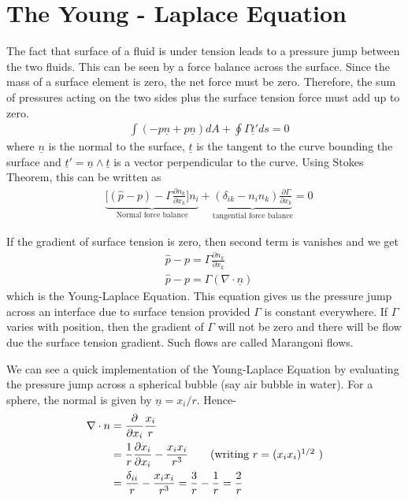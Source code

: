 \documentclass[11pt,a4paper]{article}
\newcommand{\dl}{\delta}
\newcommand{\pd}[2]{\frac{\partial #1}{\partial #2}}
\newcommand{\vect}[1]{\underline{#1}}
\newcommand{\1}{\vect{1}}
\newcommand{\grad}{\nabla}
\begin{document}
\section{The Young - Laplace Equation}
The fact that surface of a fluid is under tension leads to a pressure jump between the two fluids. This can be seen by a force balance across the surface. Since the mass of a surface element is zero, the net force must be zero. Therefore, the sum of pressures acting on the two sides plus the surface tension force must add up to zero.
\begin{align*}
&\int(-p\vect n + p \vect n) dA + \oint \Gamma \vect t' ds = 0 
\end{align*}
where $\vect n$ is the normal to the surface, $\vect t$ is the tangent to the curve bounding the surface and $\vect t' = \vect n \wedge \vect t$ is a vector perpendicular to the curve. Using Stokes Theorem, this can be written as
\begin{align*}
&\underbrace{\bigg[(\hat p - p)- \Gamma \pd{n_k}{x_k} \bigg]n_i}_{\text{Normal force balance}} + \underbrace{(\dl_{ik} - n_in_k)\pd{\Gamma}{x_k}}_{\text{tangential force balance}} = 0
\end{align*}

If the gradient of surface tension is zero, then second term is vanishes and we get
\begin{align*}
&\hat p - p = \Gamma \pd{n_k}{x_k}\\
&\hat p - p = \Gamma (\grad\cdot \vect{n})
\end{align*}
which is the Young-Laplace Equation. This equation gives us the pressure jump across an interface due to surface tension provided $\Gamma$ is constant everywhere. If $\Gamma$ varies with position, then the gradient of $\Gamma$ will not be zero and there will be flow due the surface tension gradient. Such flows are called Marangoni flows. 

We can see a quick implementation of the Young-Laplace Equation by evaluating the pressure jump across a spherical bubble (say air bubble in water). For a sphere, the normal is given by $\vect n = x_i/r$. Hence-
\begin{align*}
\grad\cdot n &= \pd{}{x_i}\frac{x_i}{r}\\
&= \frac{1}{r}\pd{x_i}{x_i} - \frac{x_i x_i}{r^3} \tag{writing $r= (x_ix_i)^{1/2}$ }\\
&= \frac{\dl_{ii}}{r} - \frac{x_i x_i}{r^3}
= \frac{3}{r} - \frac{1}{r}
= \frac{2}{r}
\end{align*}
\end{document}
